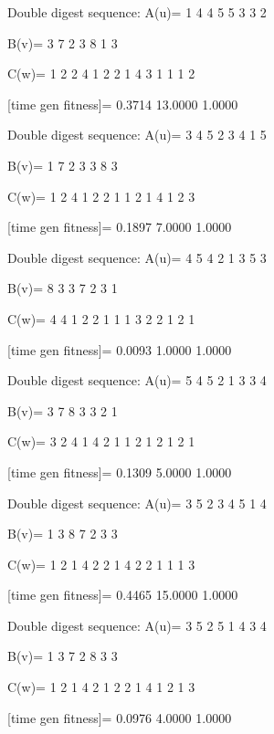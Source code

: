 Double digest sequence:
A(u)=
     1     4     4     5     5     3     3     2

B(v)=
     3     7     2     3     8     1     3

C(w)=
     1     2     2     4     1     2     2     1     4     3     1     1     1     2

[time gen fitness]=
    0.3714   13.0000    1.0000

Double digest sequence:
A(u)=
     3     4     5     2     3     4     1     5

B(v)=
     1     7     2     3     3     8     3

C(w)=
     1     2     4     1     2     2     1     1     2     1     4     1     2     3

[time gen fitness]=
    0.1897    7.0000    1.0000

Double digest sequence:
A(u)=
     4     5     4     2     1     3     5     3

B(v)=
     8     3     3     7     2     3     1

C(w)=
     4     4     1     2     2     1     1     1     3     2     2     1     2     1

[time gen fitness]=
    0.0093    1.0000    1.0000

Double digest sequence:
A(u)=
     5     4     5     2     1     3     3     4

B(v)=
     3     7     8     3     3     2     1

C(w)=
     3     2     4     1     4     2     1     1     2     1     2     1     2     1

[time gen fitness]=
    0.1309    5.0000    1.0000

Double digest sequence:
A(u)=
     3     5     2     3     4     5     1     4

B(v)=
     1     3     8     7     2     3     3

C(w)=
     1     2     1     4     2     2     1     4     2     2     1     1     1     3

[time gen fitness]=
    0.4465   15.0000    1.0000

Double digest sequence:
A(u)=
     3     5     2     5     1     4     3     4

B(v)=
     1     3     7     2     8     3     3

C(w)=
     1     2     1     4     2     1     2     2     1     4     1     2     1     3

[time gen fitness]=
    0.0976    4.0000    1.0000

